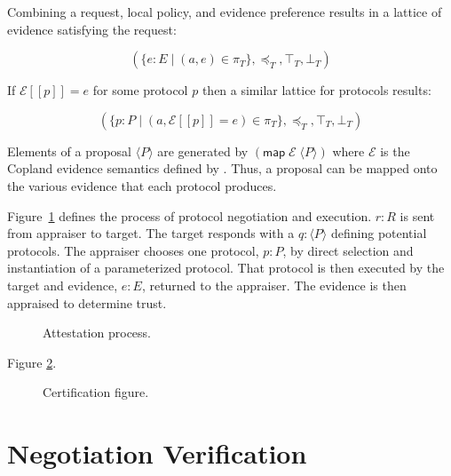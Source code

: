 \documentclass[sigconf,authordraft]{acmart}
\begin{document}
Combining a request, local policy, and evidence preference results in
a lattice of evidence satisfying the request:

\[(\{e:E\mid (a,e)\in\pi_T\},\preceq_T,\top_T,\bot_T)\]

If $\mathcal{E}[\![p]\!]=e$ for some protocol $p$ then a similar
lattice for protocols results:

\[(\{p:P\mid
  (a,\mathcal{E}[\![p]\!]=e)\in\pi_T\},\preceq_T,\top_T,\bot_T)\]


Elements of a proposal $\langle P\rangle$ are generated by
$(\mathsf{map}\; \mathcal{E}\; \langle P\rangle)$ where $\mathcal{E}$
is the Copland evidence semantics defined by \citet{Ramsdell:2019aa}.
Thus, a proposal can be mapped onto the various evidence that each
protocol produces.

Figure~\ref{fig:sequence-fig} defines the process of protocol
negotiation and execution.  $r:R$ is sent from appraiser to target.
The target responds with a $q:\langle P\rangle$ defining potential
protocols.  The appraiser chooses one protocol, $p:P$, by direct
selection and instantiation of a parameterized protocol.  That
protocol is then executed by the target and evidence, $e:E$, returned
to the appraiser.  The evidence is then appraised to determine trust.

\begin{figure}[hbtp]
  \centering 
  \caption[Attestation process]{Attestation process.}
  \label{fig:sequence-fig}
\end{figure}

Figure \ref{fig:certification-fig}.

\begin{figure}[hbtp]
  \centering 
  \caption[Attestation process]{Certification figure.}
  \label{fig:certification-fig}
\end{figure}


\section{Negotiation Verification}
\end{document}
